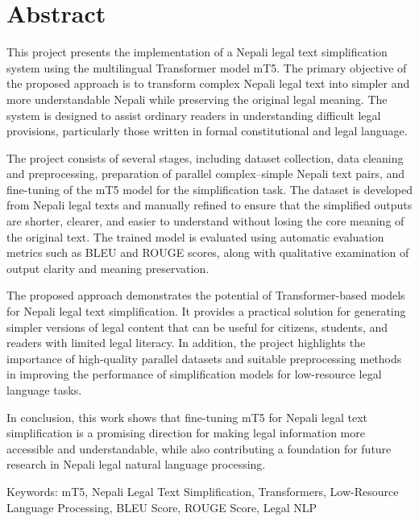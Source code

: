 \documentclass[12pt]{report}
\begin{document}
\newpage
\chapter*{Abstract}
This project presents the implementation of a Nepali legal text simplification system using the multilingual Transformer model mT5. The primary objective of the proposed approach is to transform complex Nepali legal text into simpler and more understandable Nepali while preserving the original legal meaning. The system is designed to assist ordinary readers in understanding difficult legal provisions, particularly those written in formal constitutional and legal language.

The project consists of several stages, including dataset collection, data cleaning and preprocessing, preparation of parallel complex–simple Nepali text pairs, and fine-tuning of the mT5 model for the simplification task. The dataset is developed from Nepali legal texts and manually refined to ensure that the simplified outputs are shorter, clearer, and easier to understand without losing the core meaning of the original text. The trained model is evaluated using automatic evaluation metrics such as BLEU and ROUGE scores, along with qualitative examination of output clarity and meaning preservation.

The proposed approach demonstrates the potential of Transformer-based models for Nepali legal text simplification. It provides a practical solution for generating simpler versions of legal content that can be useful for citizens, students, and readers with limited legal literacy. In addition, the project highlights the importance of high-quality parallel datasets and suitable preprocessing methods in improving the performance of simplification models for low-resource legal language tasks.

In conclusion, this work shows that fine-tuning mT5 for Nepali legal text simplification is a promising direction for making legal information more accessible and understandable, while also contributing a foundation for future research in Nepali legal natural language processing.

Keywords: mT5, Nepali Legal Text Simplification, Transformers, Low-Resource Language Processing, BLEU Score, ROUGE Score, Legal NLP

\tableofcontents
{}
\listoffigures
{}
\end{document}
